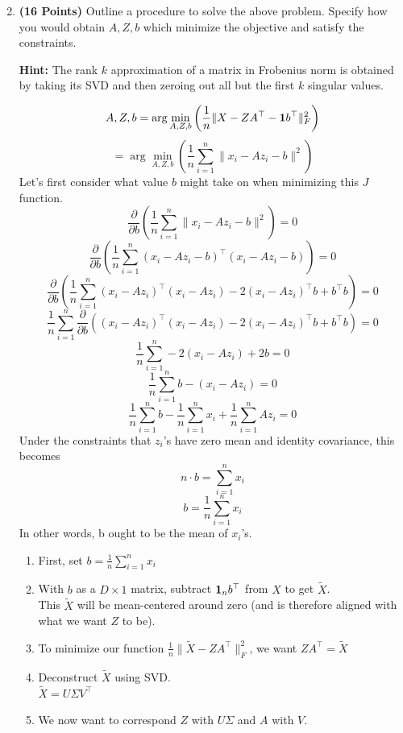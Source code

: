 \documentclass[a4paper]{article}
\newcommand*{\one}{{\bf 1}}
\theoremstyle{definition}
\newenvironment{soln}{
	\leavevmode\color{blue}\ignorespaces
}{}
\begin{document}
\begin{enumerate}
\setcounter{enumi}{1}
\item \textbf{(16 Points)}
Outline a procedure to solve the above problem. Specify how you
would obtain $A, Z, b$ which minimize the objective and satisfy the constraints.

\textbf{Hint: }The rank $k$ approximation of a matrix in Frobenius norm is obtained by
taking its SVD and then zeroing out all but the first $k$ singular values.

\begin{soln}
	$$A, Z, b = \arg \min_{A, Z, b} \left( \frac{1}{n} \| X - ZA^\top - \one b^\top\|_F^2 \right)$$
	$$ = \arg \min_{A, Z, b} \left( \frac{1}{n} \sum_{i=1}^n \|x_i - Az_i - b\|^2 \right)$$
	Let's first consider what value $b$ might take on when minimizing this $J$ function.
	$$\frac{\partial}{\partial b} \left( \frac{1}{n} \sum_{i=1}^n \|x_i - Az_i - b\|^2 \right) = 0$$
	$$\frac{\partial}{\partial b} \left( \frac{1}{n} \sum_{i=1}^n (x_i - Az_i - b)^\top (x_i - Az_i - b) \right) = 0$$
	$$\frac{\partial}{\partial b} \left( \frac{1}{n} \sum_{i=1}^n (x_i - Az_i)^\top (x_i - Az_i) - 2(x_i - Az_i)^\top b + b^\top b \right) = 0$$
	$$\frac{1}{n} \sum_{i=1}^n \frac{\partial}{\partial b} \left((x_i - Az_i)^\top (x_i - Az_i) - 2(x_i - Az_i)^\top b + b^\top b \right) = 0$$
	$$\frac{1}{n} \sum_{i=1}^n -2(x_i - Az_i) + 2b = 0$$
	$$\frac{1}{n} \sum_{i=1}^n b - (x_i - Az_i) = 0$$
	$$\frac{1}{n} \sum_{i=1}^n b - \frac{1}{n} \sum_{i=1}^n x_i + \frac{1}{n} \sum_{i=1}^n Az_i = 0$$
	Under the constraints that $z_i$'s have zero mean and identity covariance, this becomes
	$$n \cdot b = \sum_{i=1}^n x_i$$
	$$b = \frac{1}{n} \sum_{i=1}^n x_i$$
	In other words, b ought to be the mean of $x_i$'s.
	\begin{enumerate}
		\item First, set $b = \frac{1}{n} \sum_{i=1}^{n} x_i$
		\item With $b$ as a $D \times 1$ matrix, subtract $\one_n b^\top$ from $X$ to get $\tilde{X}$. \\
		This $\tilde{X}$ will be mean-centered around zero (and is therefore aligned with what we want $Z$ to be).
		\item To minimize our function $\frac{1}{n} \|\tilde{X} - Z A^\top \|_F^2$, we want $Z A^\top = \tilde{X}$
		\item Deconstruct $\tilde{X}$ using SVD. \\ $\tilde{X} = U \Sigma V^\top$
		\item We now want to correspond $Z$ with $U \Sigma$ and $A$ with $V$.

\end{enumerate}
\end{soln}
\end{enumerate}
\end{document}
